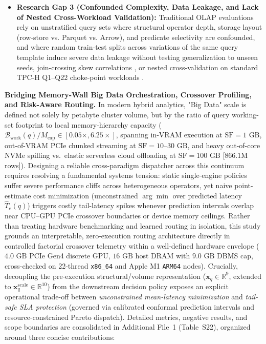 \documentclass[10pt,a4paper]{article}
\begin{document}
\begin{itemize}[leftmargin=1.5em,itemsep=2pt]
    \item \textbf{Research Gap 3 (Confounded Complexity, Data Leakage, and Lack of Nested Cross-Workload Validation):} Traditional OLAP evaluations \cite{ahmed2020hibench, abdalla2022bigdata} rely on unstratified query sets where structural operator depth, storage layout (row-store vs. Parquet vs. Arrow), and predicate selectivity are confounded, and where random train-test splits across variations of the same query template induce severe data leakage without testing generalization to unseen seeds, join-crossing skew correlations \cite{boncz2017jcch}, or nested cross-validation on standard TPC-H Q1--Q22 choke-point workloads \cite{boncz2014tpch, dreseler2020quantifying}.
\end{itemize}

\par\vspace{7pt plus 2pt minus 1pt}\noindent\textbf{Bridging Memory-Wall Big Data Orchestration, Crossover Profiling, and Risk-Aware Routing.}
In modern hybrid analytics, "Big Data" scale is defined not solely by petabyte cluster volume, but by the ratio of query working-set footprint to local memory-hierarchy capacity ($\mathcal{B}_{\text{work}}(q)/M_{\text{cap}} \in [0.05\times, 6.25\times]$, spanning in-VRAM execution at $\text{SF}=1\text{ GB}$, out-of-VRAM PCIe chunked streaming at $\text{SF}=10\text{--}30\text{ GB}$, and heavy out-of-core NVMe spilling vs.\ elastic serverless cloud offloading at $\text{SF}=100\text{ GB}$ [$866.1\text{M}$ rows]). Designing a reliable cross-paradigm dispatcher across this continuum requires resolving a fundamental systems tension: static single-engine policies suffer severe performance cliffs across heterogeneous operators, yet naive point-estimate cost minimization (unconstrained $\arg\min$ over predicted latency $\hat{T}_e(q)$) triggers costly tail-latency spikes whenever prediction intervals overlap near CPU--GPU PCIe crossover boundaries or device memory ceilings. Rather than treating hardware benchmarking and learned routing in isolation, this study grounds an interpretable, zero-execution routing architecture directly in controlled factorial crossover telemetry within a well-defined hardware envelope ($4.0\text{ GB}$ PCIe Gen4 discrete GPU, $16\text{ GB}$ host DRAM with $9.0\text{ GB}$ DBMS cap, cross-checked on 22-thread \texttt{x86\_64} and Apple M1 \texttt{ARM64} nodes). Crucially, decoupling the pre-execution structural/volume representation ($\mathbf{x}_q \in \mathbb{R}^9$, extended to $\mathbf{x}_q^{\text{scale}}\in\mathbb{R}^{10}$) from the downstream decision policy exposes an explicit operational trade-off between \emph{unconstrained mean-latency minimization} and \emph{tail-safe SLA protection} (governed via calibrated conformal prediction intervals and resource-constrained Pareto dispatch). Detailed metrics, negative results, and scope boundaries are consolidated in Additional File~1 (Table~S22), organized around three concise contributions:
\end{document}
